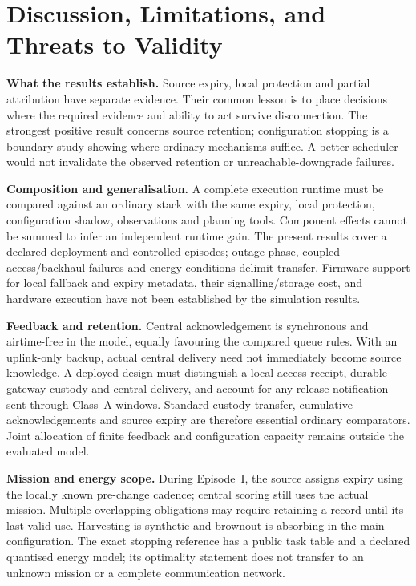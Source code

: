 \documentclass[journal,10pt]{IEEEtran}
\begin{document}
\section{Discussion, Limitations, and Threats to Validity}
\label{sec:disc}

\textbf{What the results establish.} Source expiry, local protection and partial attribution have
separate evidence. Their common lesson is to place decisions where the required evidence and
ability to act survive disconnection. The strongest positive result concerns source retention;
configuration stopping is a boundary study showing where ordinary mechanisms suffice. A better
scheduler would not invalidate the observed retention or unreachable-downgrade failures.

\textbf{Composition and generalisation.} A complete execution runtime must be compared against
an ordinary stack with the same expiry, local protection, configuration shadow, observations and
planning tools. Component effects cannot be summed to infer an independent runtime gain. The
present results cover a declared deployment and controlled episodes; outage phase, coupled
access/backhaul failures and energy conditions delimit transfer. Firmware support for local
fallback and expiry metadata, their signalling/storage cost, and hardware execution have not
been established by the simulation results.

\textbf{Feedback and retention.} Central acknowledgement is synchronous and airtime-free in the
model, equally favouring the compared queue rules. With an uplink-only backup, actual central
delivery need not immediately become source knowledge. A deployed design must distinguish a
local access receipt, durable gateway custody and central delivery, and account for any release
notification sent through Class~A windows. Standard custody transfer, cumulative acknowledgements
and source expiry are therefore essential ordinary comparators. Joint allocation of finite
feedback and configuration capacity remains outside the evaluated model.

\textbf{Mission and energy scope.} During Episode~I, the source assigns expiry using the locally
known pre-change cadence; central scoring still uses the actual mission. Multiple overlapping
obligations may require retaining a record until its last valid use. Harvesting is synthetic and
brownout is absorbing in the main configuration. The exact stopping reference has a public task
table and a declared quantised energy model; its optimality statement does not transfer to an
unknown mission or a complete communication network.
\end{document}
